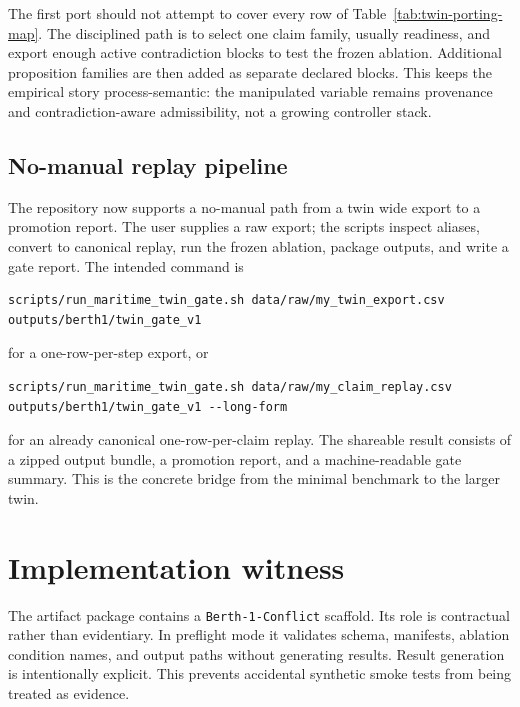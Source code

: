 \documentclass[11pt]{article}
\newcommand{\1}{\mathbf{1}}
\theoremstyle{definition}
\theoremstyle{plain}
\theoremstyle{remark}
\begin{document}
The first port should not attempt to cover every row of Table~\ref{tab:twin-porting-map}. The disciplined path is to select one claim family, usually readiness, and export enough active contradiction blocks to test the frozen ablation. Additional proposition families are then added as separate declared blocks. This keeps the empirical story process-semantic: the manipulated variable remains provenance and contradiction-aware admissibility, not a growing controller stack.

\subsection{No-manual replay pipeline}

The repository now supports a no-manual path from a twin wide export to a promotion report. The user supplies a raw export; the scripts inspect aliases, convert to canonical replay, run the frozen ablation, package outputs, and write a gate report. The intended command is
\begin{verbatim}
scripts/run_maritime_twin_gate.sh data/raw/my_twin_export.csv outputs/berth1/twin_gate_v1
\end{verbatim}
for a one-row-per-step export, or
\begin{verbatim}
scripts/run_maritime_twin_gate.sh data/raw/my_claim_replay.csv outputs/berth1/twin_gate_v1 --long-form
\end{verbatim}
for an already canonical one-row-per-claim replay. The shareable result consists of a zipped output bundle, a promotion report, and a machine-readable gate summary. This is the concrete bridge from the minimal benchmark to the larger twin.

\section{Implementation witness}
\label{sec:implementation}

The artifact package contains a \texttt{Berth-1-Conflict} scaffold. Its role is contractual rather than evidentiary. In preflight mode it validates schema, manifests, ablation condition names, and output paths without generating results. Result generation is intentionally explicit. This prevents accidental synthetic smoke tests from being treated as evidence.
\end{document}
